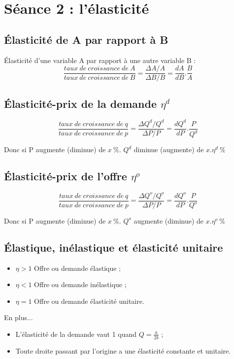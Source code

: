 \section{Séance 2 : l'élasticité}



\subsection{Élasticité de A par rapport à B}
Élasticité d'une variable A par rapport à une autre variable B :
$$\frac{taux\ de\ croissance\ de\ A}{taux\ de\ croissance\ de\ B}=\frac{\Delta A/A}{\Delta B/B}=\frac{dA}{dB}.\frac{B}{A}$$



\subsection{Élasticité-prix de la demande $\eta^d$}
$$\frac{taux\ de\ croissance\ de\ q}{taux\ de\ croissance\ de\ p}=\frac{\Delta Q^d/Q^d}{\Delta P/P}=\frac{dQ^d}{dP}.\frac{P}{Q^d}$$ 

Donc si P augmente (diminue) de $x\ \%$. $Q^d$ diminue (augmente) de $x.\eta^d\ \%$



\subsection{Élasticité-prix de l'offre $\eta^o$}
$$\frac{taux\ de\ croissance\ de\ q}{taux\ de\ croissance\ de\ p}=\frac{\Delta Q^o/Q^o}{\Delta P/P}=\frac{dQ^o}{dP}.\frac{P}{Q^o}$$ 

Donc si P augmente (diminue) de $x\ \%$. $Q^o$ augmente (diminue) de $x.\eta^o\ \%$



\subsection{Élastique, inélastique et élasticité unitaire}
\begin{itemize} 
    \item $\eta > 1$ Offre ou demande élastique ;
    \item $\eta < 1$ Offre ou demande inélastique ;
    \item $\eta = 1$ Offre ou demande élasticité unitaire.
\end{itemize}
En plus...
\begin{itemize}
    \item L’élasticité de la demande vaut 1 quand $Q=\frac{a}{2b}$ ;
    \item Toute droite passant par l’origine a une élasticité constante et unitaire.
\end{itemize}


